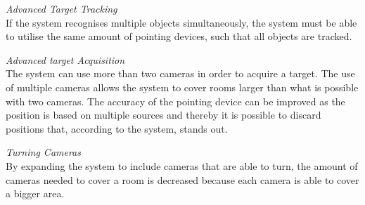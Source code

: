 \emph{Advanced Target Tracking}\\
If the system recognises multiple objects simultaneously, the system must be able to utilise the same amount of pointing devices, such that all objects are tracked.

\emph{Advanced target Acquisition}\\
The system can use more than two cameras in order to acquire a target. The use of multiple cameras allows the system to cover rooms larger than what is possible with two cameras. The accuracy of the pointing device can be improved as the position is based on multiple sources and thereby it is possible to discard positions that, according to the system, stands out.


\emph{Turning Cameras}\\
By expanding the system to include cameras that are able to turn, the amount of cameras needed to cover a room is decreased because each camera is able to cover a bigger area.